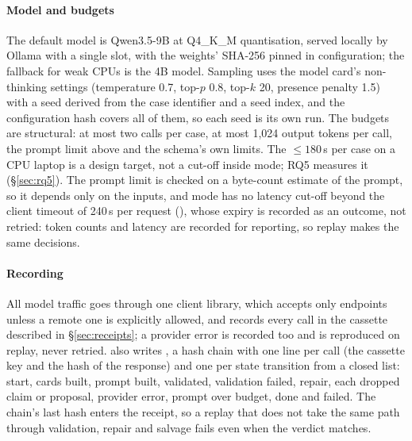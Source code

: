 \paragraph{Model and budgets}
The default model is Qwen3.5-9B at Q4\_K\_M quantisation, served locally by Ollama with a single slot, with the weights' SHA-256 pinned in configuration; the fallback for weak CPUs is the 4B model.
Sampling uses the model card's non-thinking settings (temperature 0.7, top-$p$ 0.8, top-$k$ 20, presence penalty 1.5)~\cite{qwen35card} with a seed derived from the case identifier and a seed index, and the configuration hash covers all of them, so each seed is its own run.
The budgets are structural: at most two calls per case, at most 1{,}024 output tokens per call, the prompt limit above and the schema's own limits.
The $\leq 180$\,s per case on a CPU laptop is a design target, not a cut-off inside  mode; RQ5 measures it (\S\ref{sec:rq5}).
The prompt limit is checked on a byte-count estimate of the prompt, so it depends only on the inputs, and  mode has no latency cut-off beyond the client timeout of 240\,s per request (), whose expiry is recorded as an outcome, not retried: token counts and latency are recorded for reporting, so replay makes the same decisions.

\paragraph{Recording}
All model traffic goes through one client library, which accepts only  endpoints unless a remote one is explicitly allowed, and records every call in the cassette described in \S\ref{sec:receipts}; a provider error is recorded too and is reproduced on replay, never retried.
 also writes , a hash chain with one line per call (the cassette key and the hash of the response) and one per state transition from a closed list: start, cards built, prompt built, validated, validation failed, repair, each dropped claim or proposal, provider error, prompt over budget, done and failed.
The chain's last hash enters the receipt, so a replay that does not take the same path through validation, repair and salvage fails even when the verdict matches.

